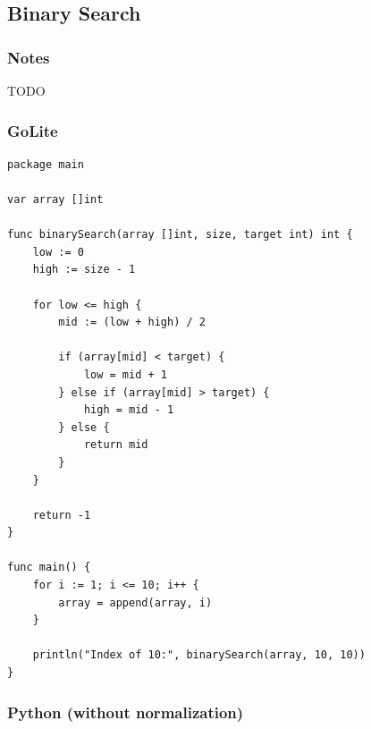 \documentclass{article}
\begin{document}
\subsection{Binary Search}

\subsubsection{Notes}
TODO 

\subsubsection{GoLite}

\begin{lstlisting}
package main

var array []int

func binarySearch(array []int, size, target int) int {
    low := 0
    high := size - 1

    for low <= high {
        mid := (low + high) / 2
        
        if (array[mid] < target) {
            low = mid + 1
        } else if (array[mid] > target) {
            high = mid - 1
        } else {
            return mid
        }
    }

    return -1
}

func main() {
    for i := 1; i <= 10; i++ {
        array = append(array, i)
    }

    println("Index of 10:", binarySearch(array, 10, 10))
}

\end{lstlisting}

\subsubsection{Python (without normalization)}
\end{document}
